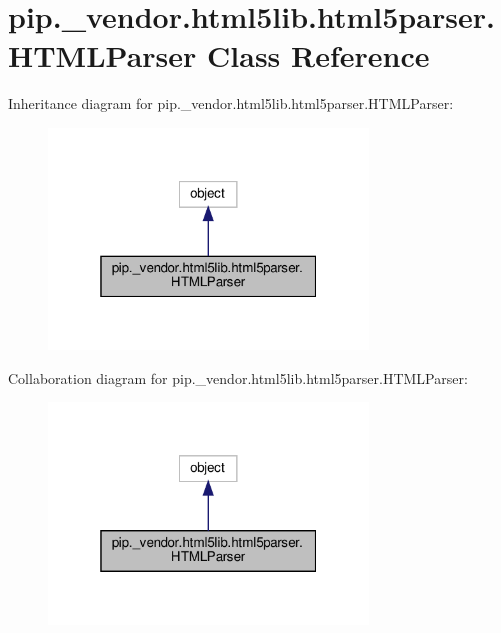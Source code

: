 \hypertarget{classpip_1_1__vendor_1_1html5lib_1_1html5parser_1_1HTMLParser}{}\section{pip.\+\_\+vendor.\+html5lib.\+html5parser.\+H\+T\+M\+L\+Parser Class Reference}
\label{classpip_1_1__vendor_1_1html5lib_1_1html5parser_1_1HTMLParser}


Inheritance diagram for pip.\+\_\+vendor.\+html5lib.\+html5parser.\+H\+T\+M\+L\+Parser\+:
\nopagebreak
\begin{figure}[H]
\begin{center}
\leavevmode
\includegraphics[width=241pt]{classpip_1_1__vendor_1_1html5lib_1_1html5parser_1_1HTMLParser__inherit__graph}
\end{center}
\end{figure}


Collaboration diagram for pip.\+\_\+vendor.\+html5lib.\+html5parser.\+H\+T\+M\+L\+Parser\+:
\nopagebreak
\begin{figure}[H]
\begin{center}
\leavevmode
\includegraphics[width=241pt]{classpip_1_1__vendor_1_1html5lib_1_1html5parser_1_1HTMLParser__coll__graph}
\end{center}
\end{figure}
